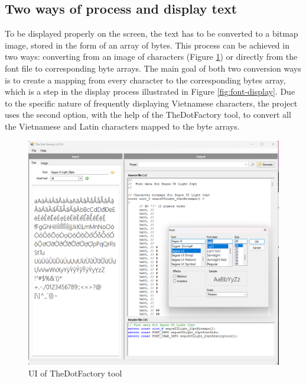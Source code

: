\documentclass[../Main.tex]{subfiles}
\begin{document}
\subsection{Two ways of process and display text}
\label{2-ways-process}
To be displayed properly on the screen, the text has to be converted to a bitmap image, stored in the form of an array of bytes. This process can be achieved in two ways: converting from an image of characters (Figure \ref{fig:thedotfactory}) or directly from the font file to corresponding byte arrays. The main goal of both two conversion ways is to create a mapping from every character to the corresponding bytes array, which is a step in the display process illustrated in Figure \ref{fig:font-display}. Due to the specific nature of frequently displaying Vietnamese characters, the project uses the second option, with the help of the TheDotFactory tool, to convert all the Vietnamese and Latin characters mapped to the byte arrays.
\begin{figure}[h]
    \centering
    \includegraphics[width=0.8\linewidth]{doc/imgs/thedotfactory.png}
    \caption{UI of TheDotFactory tool}
    \label{fig:thedotfactory}
\end{figure}
\end{document}
